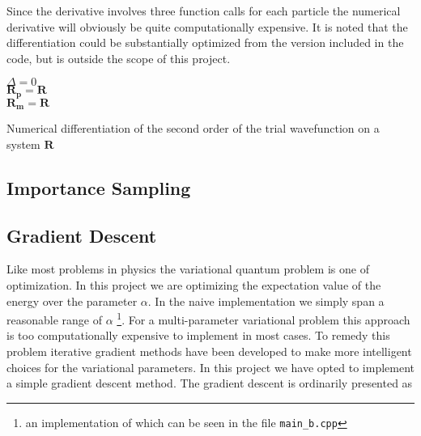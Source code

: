 Since the derivative involves three function calls for each particle the numerical derivative will obviously be quite computationally expensive. It is noted  that the differentiation could be substantially optimized from the version included in the code, but is outside the scope of this project. 

\begin{algorithm}[H]
\BlankLine
$\Delta = 0$ \\
$\mathbf{R_p} = \mathbf{R}$\\
$\mathbf{R_m} = \mathbf{R}$\\
\BlankLine
{}
\BlankLine
\caption{Numerical differentiation of the second order of the trial wavefunction on a system $\mathbf{R}$}\label{alg:nd}
\end{algorithm} 


\subsection{Importance Sampling}

\subsection{Gradient Descent}
Like most problems in physics the variational quantum problem is one of optimization. In this project we are optimizing the expectation value of the energy over the parameter $\alpha$. In the naive implementation we simply span a reasonable range of $\alpha$ \footnote{an implementation of which can be seen in the file \lstinline{main_b.cpp}}. For a multi-parameter variational problem this approach is too computationally expensive to implement in most cases. To remedy this problem iterative gradient methods have been developed to make more intelligent choices for the variational parameters. In this project we have opted to implement a simple gradient descent method. The gradient descent is ordinarily presented as 

